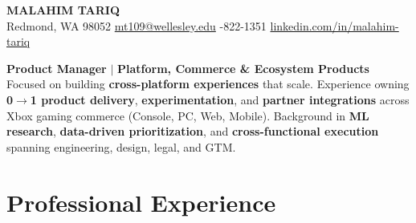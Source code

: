 \documentclass[11pt]{article}
\begin{document}
\begin{center}
  {\LARGE\bfseries
    {\huge M}ALAHIM {\huge T}ARIQ
  }\vspace{4pt}\\
  Redmond, WA 98052 \;\textbullet\;
  \href{mailto:mt109@wellesley.edu}{mt109@wellesley.edu} \;\textbullet{}-822-1351 \;\textbullet\;
  \href{https://www.linkedin.com/in/malahim-tariq}{linkedin.com/in/malahim-tariq}
\end{center}

\vspace{2pt}
\noindent\textbf{Product Manager} $|$ \textbf{Platform, Commerce \& Ecosystem Products} \\
\noindent Focused on building \textbf{cross-platform experiences} that scale. Experience owning \textbf{0$\to$1 product delivery}, \textbf{experimentation}, and \textbf{partner integrations} across Xbox gaming commerce (Console, PC, Web, Mobile). Background in \textbf{ML research}, \textbf{data-driven prioritization}, and \textbf{cross-functional execution} spanning engineering, design, legal, and GTM.

\section{Professional Experience}
\end{document}
